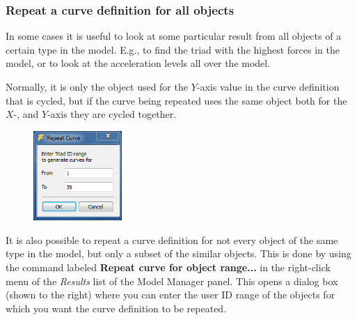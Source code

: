 \subsubsection{Repeat a curve definition for all objects}

In some cases it is useful to look at some particular result from all objects
of a certain type in the model. E.g., to find the triad with the highest forces
in the model, or to look at the acceleration levels all over the model.


Normally, it is only the object used for the $Y$-axis value in the curve
definition that is cycled, but if the curve being repeated uses the same object
both for the $X$-, and $Y$-axis they are cycled together.

\begin{figure}
  \vspace{-5mm}
  \center\includegraphics[width=0.3\textwidth]{Figures/Dialogs/7-RepeatCurveForRange}
\end{figure}

It is also possible to repeat a curve definition for not every object of the
same type in the model, but only a subset of the similar objects. This is done
by using the command labeled \textbf{Repeat curve for object range...}
in the right-click menu of the {\sl Results} list of the Model Manager panel.
This opens a dialog box (shown to the right) where you can enter the user ID
range of the objects for which you want the curve definition to be repeated.

